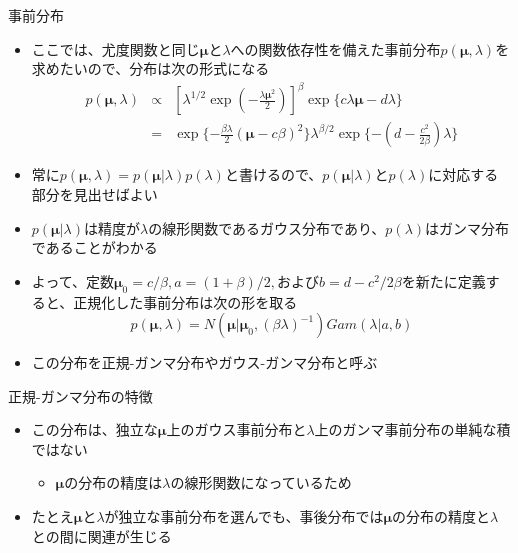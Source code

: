 \begin{frame}{事前分布}
 \begin{itemize}
  \item ここでは、尤度関数と同じ$\bm{\mu}$と$\lambda$への関数依存性を備えた事前分布$p(\bm{\mu},\lambda)$を求めたいので、分布は次の形式になる
        \begin{eqnarray}
         p(\bm{\mu},\lambda) &\propto& [\lambda^{1/2}\exp(-\frac{\lambda\bm{\mu}^2}{2})]^\beta \exp\{c\lambda\bm{\mu}-d\lambda\} \nonumber \\
         &= & \exp\{-\frac{\beta\lambda}{2}(\bm{\mu}-c\beta)^2\}\lambda^{\beta/2}\exp\{-(d-\frac{c^2}{2\beta})\lambda\}
        \end{eqnarray}
  \item 常に$p(\bm{\mu},\lambda)=p(\bm{\mu}|\lambda)p(\lambda)$と書けるので、$p(\bm{\mu}|\lambda)$と$p(\lambda)$に対応する部分を見出せばよい
  \item $p(\bm{\mu}|\lambda)$は精度が$\lambda$の線形関数であるガウス分布であり、$p(\lambda)$はガンマ分布であることがわかる
  \item よって、定数$\bm{\mu}_0=c/\beta, a=(1+\beta)/2,$および$b=d-c^2/2\beta$を新たに定義すると、正規化した事前分布は次の形を取る
        \begin{equation}
         p(\bm{\mu},\lambda)=N(\bm{\mu}|\bm{\mu}_0, (\beta\lambda)^{-1})Gam(\lambda|a,b)
        \end{equation}
  \item この分布を\alert{正規-ガンマ分布}や\alert{ガウス-ガンマ分布}と呼ぶ
 \end{itemize}
\end{frame}

\begin{frame}{正規-ガンマ分布の特徴}
 \begin{itemize}
  \item この分布は、独立な$\bm{\mu}$上のガウス事前分布と$\lambda$上のガンマ事前分布の単純な積ではない
        \begin{itemize}
         \item $\bm{\mu}$の分布の精度は$\lambda$の線形関数になっているため
        \end{itemize}
  \item たとえ$\bm{\mu}$と$\lambda$が独立な事前分布を選んでも、事後分布では$\bm{\mu}$の分布の精度と$\lambda$との間に関連が生じる
 \end{itemize}
\end{frame}

